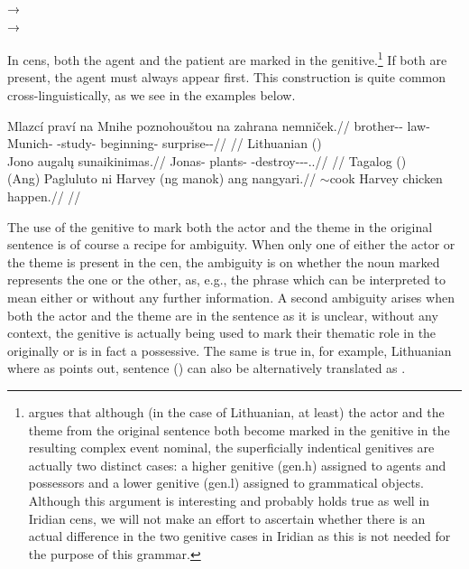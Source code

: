 \pex
    \a {} → \\
    \a {} → \\
\xe

In {\sc cen}s, both the agent and the patient are marked in the
genitive.\footnote{\textcite{serekaite2020} argues that although
(in the case of Lithuanian, at least) the actor and the theme from the original
sentence both become marked in the genitive in the resulting complex event
nominal, the superficially indentical genitives are actually two distinct cases:
a higher genitive ({\sc gen.h}) assigned to agents and possessors and a lower
genitive ({\sc gen.l}) assigned to grammatical objects. Although this argument
is interesting and probably holds true as well in Iridian {\sc cen}s, we will
not make an effort to ascertain whether there is an actual difference in the two
genitive cases in Iridian as this is not needed for the purpose of this
grammar.} If both are present, the agent must always appear first. This
construction is quite common cross-linguistically, as we see in the examples
below.

\pex
\a\begingl
    \gla Mlazcí praví na Mnihe poznohouštou na zahrana nemniček.//
    \glb brother-\Dim{}-\Gen{} law-\Gen{} \Loc{} Munich-\Acc{} \Ger{}-study-\Nz{} \Loc{} beginning-\Acc{} surprise-\Av{}-\Pf{}//
    \glft {}//
\endgl
\a Lithuanian (\cite[1]{serekaite2020})\\
\begingl
    \gla Jono augalų sunaikinimas.//
    \glb Jonas-\Gen{} plants-\Gen{} \Pfv{}-destroy-\Caus{}-\Nz-\Nom{}.\M{}.\Sg{}//
    \glft {}//
\endgl
\a Tagalog (\cite[22]{hsieh2019})\\
\begingl
    \gla (Ang) Pagluluto ni Harvey (ng manok) ang nangyari.//
    \glb \Nom{} \Ger{}$\sim$cook \Gen{} Harvey \Gen{} chicken \Nom{} happen.\Pfv{}//
    \glft {}//
\endgl
\xe

The use of the genitive to mark both the actor and the theme in
the original sentence is of course a recipe for ambiguity. When only one of
either the actor or the theme is present in the {\sc cen}, the ambiguity is on
whether the noun marked represents the one or the other, as, e.g., the phrase
 which can be interpreted to mean either  or  without any further
information. A second ambiguity arises when both the actor and the theme are in
the sentence as it is unclear, without any context, the genitive is actually
being used to mark their thematic role in the originally or is in fact a
possessive. The same is true in, for example, Lithuanian where
as \textcite{serekaite2020} points out, sentence
() can also be alternatively translated as
.

